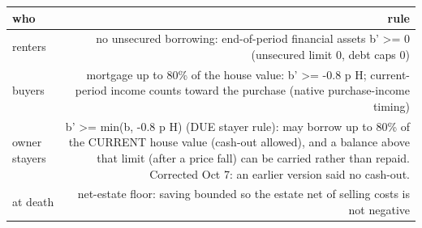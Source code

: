 \begin{tabular}{lr}
\toprule
who & rule \\
\midrule
renters & no unsecured borrowing: end-of-period financial assets b' >= 0 (unsecured limit 0, debt caps 0) \\
buyers & mortgage up to 80\% of the house value: b' >= -0.8 p H; current-period income counts toward the purchase (native purchase-income timing) \\
owner stayers & b' >= min(b, -0.8 p H) (DUE stayer rule): may borrow up to 80\% of the CURRENT house value (cash-out allowed), and a balance above that limit (after a price fall) can be carried rather than repaid. Corrected Oct 7: an earlier version said no cash-out. \\
at death & net-estate floor: saving bounded so the estate net of selling costs is not negative \\
\bottomrule
\end{tabular}
